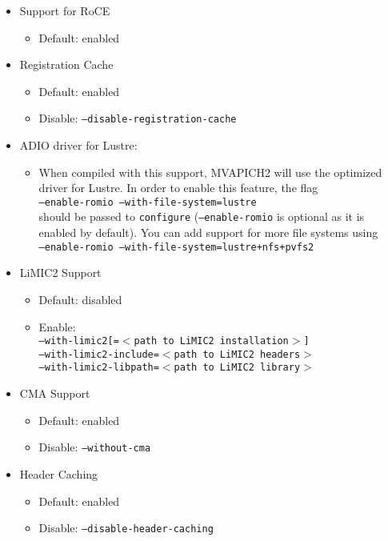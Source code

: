 \begin{itemize}
	\item Support for RoCE
		\begin{itemize}
			\item Default: enabled
		\end{itemize}

	\item Registration Cache
		\begin{itemize}
			\item Default: enabled
			\item Disable: \texttt{--disable-registration-cache}
		\end{itemize}

	\item ADIO driver for Lustre:
		\begin{itemize}
			\item  When compiled with this support, MVAPICH2 will use the optimized
				driver for Lustre. In order to enable this feature, the flag \\
				\texttt{--enable-romio --with-file-system=lustre} \\
				 should be passed to \texttt{configure}
				(\texttt{--enable-romio} is optional as it is enabled by default).
		         You can add support for more file systems using \\
				\texttt{--enable-romio --with-file-system=lustre+nfs+pvfs2}
		\end{itemize}

	\item LiMIC2 Support
		\begin{itemize}
			\item Default: disabled
			\item Enable:\\ \texttt{--with-limic2[=$<$path to LiMIC2 installation$>$]\\
			--with-limic2-include=$<$path to LiMIC2 headers$>$\\
			--with-limic2-libpath=$<$path to LiMIC2 library$>$}
		\end{itemize}

        \item CMA Support
            \begin{itemize}
                \item Default: enabled
                \item Disable: \texttt{--without-cma}
            \end{itemize}

	\item Header Caching
		\begin{itemize}
			\item Default: enabled
			\item Disable: \texttt{--disable-header-caching}
		\end{itemize}


\end{itemize}
